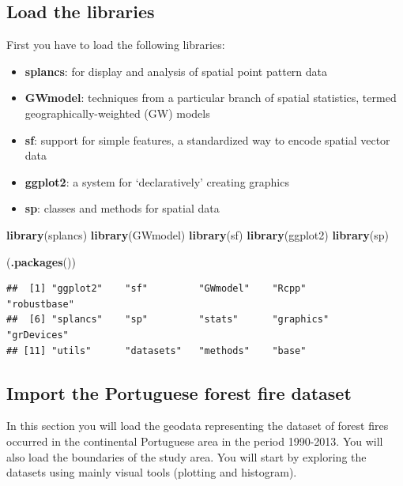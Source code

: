 \documentclass[
]{book}
\newenvironment{Shaded}{\begin{snugshade}}{\end{snugshade}}
\newcommand{\FunctionTok}[1]{\textcolor[rgb]{0.13,0.29,0.53}{\textbf{#1}}}
\newcommand{\NormalTok}[1]{#1}
\providecommand{\tightlist}{%
  \setlength{\itemsep}{0pt}\setlength{\parskip}{0pt}}
\begin{document}
\hypertarget{load-the-libraries}{%
\subsection{Load the libraries}\label{load-the-libraries}}

First you have to load the following libraries:

\begin{itemize}
\tightlist
\item
  \textbf{splancs}: for display and analysis of spatial point pattern data
\item
  \textbf{GWmodel}: techniques from a particular branch of spatial statistics, termed geographically-weighted (GW) models
\item
  \textbf{sf}: support for simple features, a standardized way to encode spatial vector data
\item
  \textbf{ggplot2}: a system for `declaratively' creating graphics
\item
  \textbf{sp}: classes and methods for spatial data
\end{itemize}

\begin{Shaded}
\begin{Highlighting}[]
\FunctionTok{library}\NormalTok{(splancs)}
\FunctionTok{library}\NormalTok{(GWmodel)}
\FunctionTok{library}\NormalTok{(sf)}
\FunctionTok{library}\NormalTok{(ggplot2)}
\FunctionTok{library}\NormalTok{(sp)}

\NormalTok{(}\FunctionTok{.packages}\NormalTok{())}
\end{Highlighting}
\end{Shaded}

\begin{verbatim}
##  [1] "ggplot2"    "sf"         "GWmodel"    "Rcpp"       "robustbase"
##  [6] "splancs"    "sp"         "stats"      "graphics"   "grDevices" 
## [11] "utils"      "datasets"   "methods"    "base"
\end{verbatim}

\hypertarget{import-the-portuguese-forest-fire-dataset}{%
\subsection{Import the Portuguese forest fire dataset}\label{import-the-portuguese-forest-fire-dataset}}

In this section you will load the geodata representing the dataset of forest fires occurred in the continental Portuguese area in the period 1990-2013.
You will also load the boundaries of the study area.
You will start by exploring the datasets using mainly visual tools (plotting and histogram).
\end{document}
